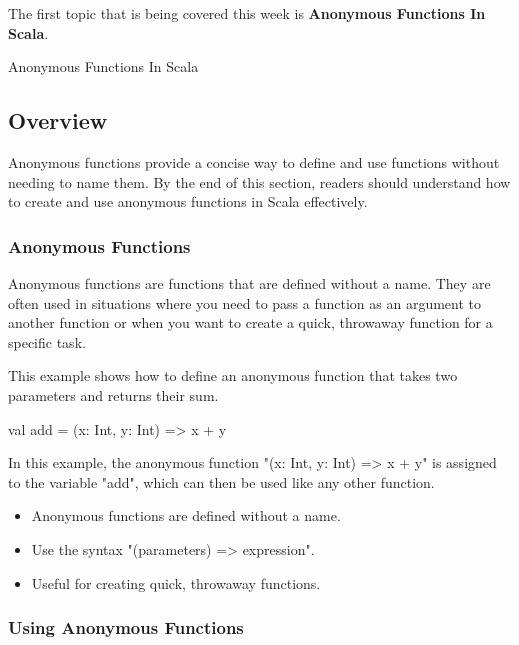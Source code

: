 The first topic that is being covered this week is \textbf{Anonymous Functions In Scala}.

\begin{notes}{Anonymous Functions In Scala}
    \subsection*{Overview}

    Anonymous functions provide a concise way to define and use functions without needing to name them. By the end of this section, readers should understand how to create and use anonymous functions in Scala effectively.
    
    \subsubsection*{Anonymous Functions}
    
    Anonymous functions are functions that are defined without a name. They are often used in situations where you need to pass a function as an argument to another function or when you want to create 
    a quick, throwaway function for a specific task.
    
    \begin{highlight}
    
        This example shows how to define an anonymous function that takes two parameters and returns their sum.
    
    \begin{code}[Scala]
    val add = (x: Int, y: Int) => x + y
    \end{code}
    
        In this example, the anonymous function "(x: Int, y: Int) => x + y" is assigned to the variable "add", which can then be used like any other function.
        
        \begin{itemize}
            \item Anonymous functions are defined without a name.
            \item Use the syntax "(parameters) => expression".
            \item Useful for creating quick, throwaway functions.
        \end{itemize}
    
    \end{highlight}
    
    \subsubsection*{Using Anonymous Functions}
    

\end{notes}
